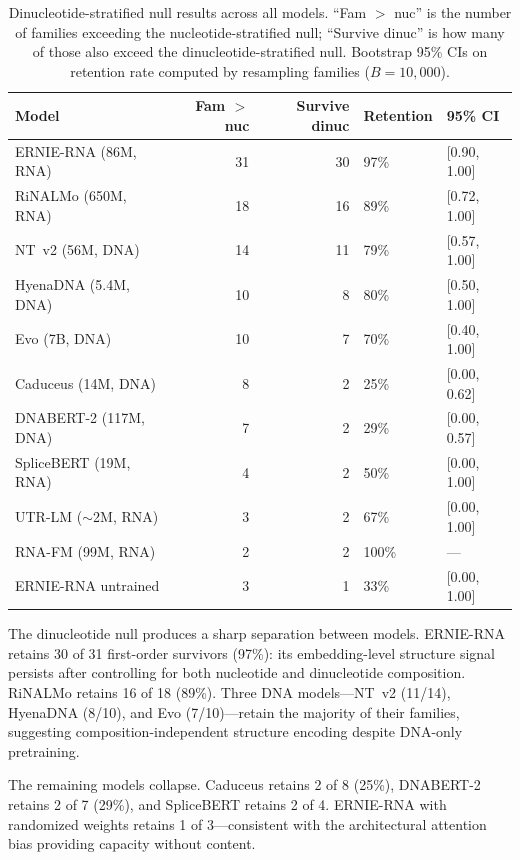 \documentclass[11pt]{article}
\begin{document}
\begin{table}[htbp]
\centering
\caption{Dinucleotide-stratified null results across all models.
``Fam $>$ nuc'' is the number of families exceeding the
nucleotide-stratified null; ``Survive dinuc'' is how many of those
also exceed the dinucleotide-stratified null. Bootstrap 95\% CIs
on retention rate computed by resampling families ($B = 10{,}000$).}
\label{tab:rung2}
\small
\begin{tabular}{lrrll}
\toprule
\textbf{Model} & \textbf{Fam $>$ nuc} & \textbf{Survive dinuc} & \textbf{Retention} & \textbf{95\% CI} \\
\midrule
ERNIE-RNA (86M, RNA)    & 31 & 30 & 97\% & [0.90, 1.00] \\
RiNALMo (650M, RNA)     & 18 & 16 & 89\% & [0.72, 1.00] \\
NT~v2 (56M, DNA)        & 14 & 11 & 79\% & [0.57, 1.00] \\
HyenaDNA (5.4M, DNA)    & 10 &  8 & 80\% & [0.50, 1.00] \\
Evo (7B, DNA)           & 10 &  7 & 70\% & [0.40, 1.00] \\
Caduceus (14M, DNA)     &  8 &  2 & 25\% & [0.00, 0.62] \\
DNABERT-2 (117M, DNA)   &  7 &  2 & 29\% & [0.00, 0.57] \\
SpliceBERT (19M, RNA)   &  4 &  2 & 50\% & [0.00, 1.00] \\
UTR-LM ($\sim$2M, RNA)  &  3 &  2 & 67\% & [0.00, 1.00] \\
RNA-FM (99M, RNA)       &  2 &  2 & 100\% & --- \\
\midrule
ERNIE-RNA untrained     &  3 &  1 & 33\% & [0.00, 1.00] \\
\bottomrule
\end{tabular}
\end{table}

The dinucleotide null produces a sharp separation between models.
ERNIE-RNA retains 30 of 31 first-order survivors (97\%): its
embedding-level structure signal persists after controlling for both
nucleotide and dinucleotide composition. RiNALMo retains 16 of 18
(89\%). Three DNA models---NT~v2 (11/14), HyenaDNA (8/10), and Evo
(7/10)---retain the majority of their families, suggesting
composition-independent structure encoding despite DNA-only
pretraining.

The remaining models collapse. Caduceus retains 2 of 8 (25\%),
DNABERT-2 retains 2 of 7 (29\%), and SpliceBERT retains 2 of 4.
ERNIE-RNA with randomized weights retains 1 of 3---consistent with
the architectural attention bias providing capacity without content.
\end{document}
